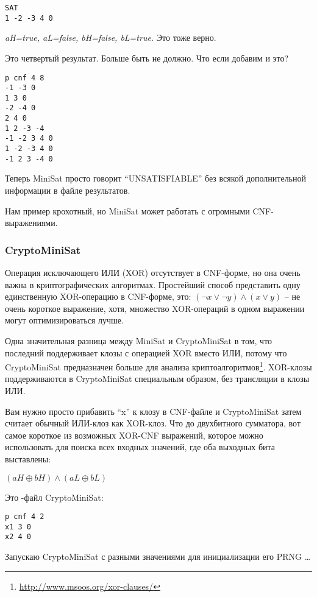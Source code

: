 \begin{lstlisting}
SAT
1 -2 -3 4 0
\end{lstlisting}

\textit{aH=true, aL=false, bH=false, bL=true.} Это тоже верно.

Это четвертый результат. Больше быть не должно. Что если добавим и это?

\begin{lstlisting}
p cnf 4 8
-1 -3 0
1 3 0
-2 -4 0
2 4 0
1 2 -3 -4
-1 -2 3 4 0
1 -2 -3 4 0
-1 2 3 -4 0
\end{lstlisting}

Теперь MiniSat просто говорит ``UNSATISFIABLE'' без всякой дополнительной информации в файле результатов.

Нам пример крохотный, но MiniSat может работать с огромными \ac{CNF}-выражениями.

\subsubsection{CryptoMiniSat}

Операция исключающего ИЛИ (XOR) отсутствует в CNF-форме, но она очень важна в криптографических алгоритмах.
Простейший способ представить одну единственную XOR-операцию в CNF-форме, это:
$(\neg x \vee \neg y) \wedge (x \vee y)$ -- не очень короткое выражение,
хотя, множество XOR-операций в одном выражении могут оптимизироваться лучше.

Одна значительная разница между MiniSat и CryptoMiniSat в том, что последний поддерживает
клозы с операцией XOR вместо ИЛИ,
потому что CryptoMiniSat предназначен больше для анализа криптоалгоритмов\footnote{\url{http://www.msoos.org/xor-clauses/}}.
XOR-клозы поддерживаются в CryptoMiniSat специальным образом, без трансляции в клозы ИЛИ.

Вам нужно просто прибавить ``x'' к клозу в \ac{CNF}-файле и CryptoMiniSat затем считает обычный ИЛИ-клоз как XOR-клоз.
Что до двухбитного сумматора, вот самое короткое из возможных XOR-CNF выражений, которое можно использовать
для поиска всех входных значений, где оба выходных бита выставлены:

$(aH \oplus bH) \wedge (aL \oplus bL)$

Это -файл CryptoMiniSat:

\begin{lstlisting}
p cnf 4 2
x1 3 0
x2 4 0
\end{lstlisting}

Запускаю CryptoMiniSat с разными значениями для инициализации его \ac{PRNG} \dots

